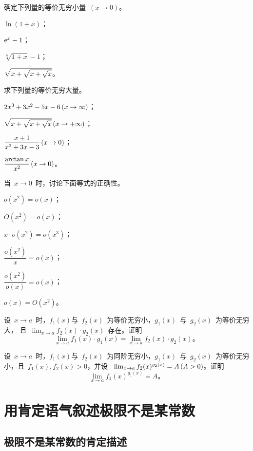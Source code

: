 \begin{exercise}
\item 确定下列量的等价无穷小量~$(x\to 0)$。
\begin{exlistcols}
  \item $\ln(1+x)$；
  \item $\mathrm e^x-1$；
  \item $\sqrt[n]{1+x}-1$；
  \item $\smbsqrt{x+\sqrt{x+\sqrt x}}$。
\end{exlistcols}
\item 求下列量的等价无穷大量。
\begin{exlistcols}
  \item $2x^3+3x^2-5x-6\mcond{x\to\infty}$；
  \item $\smbsqrt{x+\sqrt{x+\sqrt x}}\mcond{x\to+\infty}$；
  \item $\dfrac{x+1}{x^2+3x-3}\mcond{x\to0}$；
  \item $\dfrac{\arctan x}{x^2}\mcond{x\to0}$。
\end{exlistcols}
\item 当~$x\to0$~时，讨论下面等式的正确性。
\begin{exlistcols}[3]
  \item $o(x^2)=o(x)$；
  \item $O(x^2)=o(x)$；
  \item $x\cdot o(x^2)=o(x^3)$；
  \item $\dfrac{o(x^2)}x=o(x)$；
  \item $\dfrac{o(x^2)}{o(x)}=o(x)$；
  \item $o(x)=O(x^2)$。
\end{exlistcols}
\item 设~$x\to a$~时，$f_1(x)$与~$f_2(x)$~为等价无穷小，$g_1(x)$~与~$g_2(x)$~为等价无穷大，%
且~$\lim_{x\to a}f_2(x)\cdot g_2(x)$~存在。证明
\[
  \lim_{x\to a}f_1(x)\cdot g_1(x)=\lim_{x\to a}f_2(x)\cdot g_2(x)。
\]
\item 设~$x\to a$~时，$f_1(x)$与~$f_2(x)$~为同阶无穷小，$g_1(x)$~与~$g_2(x)$~为等价无穷小，且~$f_1(x),f_2(x)>0$，并设
~$\lim_{x\to a}f_2(x)^{g_2(x)}=A\mcond{A>0}$。证明
\[
  \lim_{x\to a}f_1(x)^{g_1(x)}=A 。
\]
\end{exercise}


\section{用肯定语气叙述极限不是某常数}

\subsection{极限不是某常数的肯定描述}

